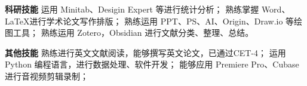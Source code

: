 \documentclass[a4paper,11pt]{ctexart}
\begin{document}
  \vspace{-1mm}

  \item \enspace\textbf{科研技能}\vspace{-2.4mm}
  \resumeItemListStart
    {运用 Minitab、Desigin Expert 等进行统计分析；}
    {熟练掌握 Word、\LaTeX 进行学术论文写作排版；}
    {熟练运用 PPT、PS、AI、Origin、Draw.io 等绘图工具；}
    {熟练运用 Zotero，Obsidian 进行文献分类、整理、总结。}
  \resumeItemListEnd

  \vspace{-1mm}

  \item \enspace\textbf{其他技能}\vspace{-2.4mm}
  \resumeItemListStart
    {熟练进行英文文献阅读，能够撰写英文论文，已通过CET-4；}
    {运用 Python 编程语言，进行数据处理、软件开发；}
    {能够应用 Premiere Pro、Cubase 进行音视频剪辑录制；}
  \resumeItemListEnd
  
\resumeSubHeadingListEnd

\vspace{-8mm}






\end{document}

